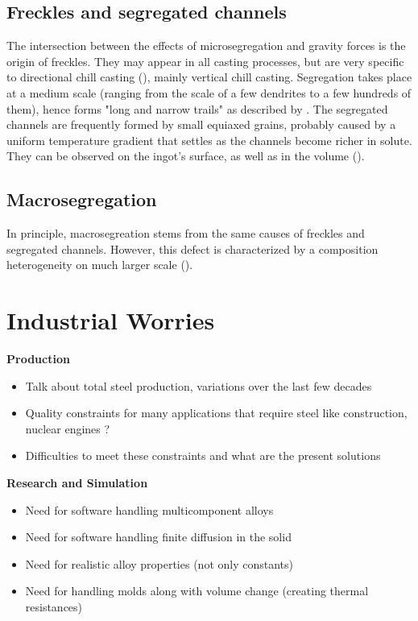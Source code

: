 \subsection*{Freckles and segregated channels} 
The intersection between the effects of microsegregation and gravity forces is the origin of freckles. They may appear 
in all casting processes, but are very specific to directional chill casting (\citep{giamei_nature_1970}), mainly vertical chill casting. 
Segregation takes place at a medium scale (ranging from the scale of a few dendrites to a few hundreds of them), hence forms "long and narrow trails" as described by \citet{felicelli_simulation_1991}. The segregated channels are frequently formed by small equiaxed grains, probably caused by a uniform temperature
gradient that settles as the channels become richer in solute. They can be observed on the ingot's surface, as well as in the volume ().

\subsection*{Macrosegregation}
In principle, macrosegreation stems from the same causes of freckles and segregated channels. However, this defect is characterized by a composition heterogeneity on much larger scale (). 

\section*{Industrial Worries}
\textbf{Production}

\begin{itemize}
\item Talk about total steel production, variations over the last few decades
\item Quality constraints for many applications that require steel like construction, nuclear engines ? 
\item Difficulties to meet these constraints and what are the present solutions
\end{itemize}
\textbf{Research and Simulation}
\begin{itemize}
\item Need for software handling multicomponent alloys
\item Need for software handling finite diffusion in the solid
\item Need for realistic alloy properties (not only constants)
\item Need for handling molds along with volume change (creating thermal resistances)
\end{itemize}


